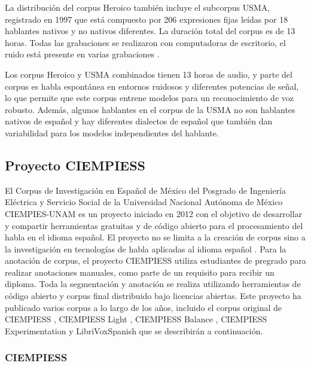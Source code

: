 La distribución del corpus Heroico también incluye el subcorpus USMA, registrado en 1997 que está compuesto por 206 expresiones fijas leídas por 18 hablantes nativos y no nativos diferentes. La duración total del corpus es de 13 horas. Todas las grabaciones se realizaron con computadoras de escritorio, el ruido está presente en varias grabaciones \cite{heroico}.

Los corpus Heroico y USMA combinados tienen 13 horas de audio, y parte del corpus es habla espontánea en entornos ruidosos y diferentes potencias de señal, lo que permite que este corpus entrene modelos para un reconocimiento de voz robusto. Además, algunos hablantes en el corpus de la USMA no son hablantes nativos de español y hay diferentes dialectos de español que también dan variabilidad para los modelos independientes del hablante.

\subsection{Proyecto CIEMPIESS}

El Corpus de Investigación en Español de México del Posgrado de Ingeniería Eléctrica y Servicio Social de la Universidad Nacional Autónoma de México CIEMPIES-UNAM es un proyecto iniciado en 2012 con el objetivo de desarrollar y compartir herramientas gratuitas y de código abierto para el procesamiento del habla en el idioma español. El proyecto no se limita a la creación de corpus sino a la investigación en tecnologías de habla aplicadas al idioma español \cite{CIEMPIESS-Webpage}. Para la anotación de corpus, el proyecto CIEMPIESS utiliza estudiantes de pregrado para realizar anotaciones manuales, como parte de un requisito para recibir un diploma. Toda la segmentación y anotación se realiza utilizando herramientas de código abierto y corpus final distribuido bajo licencias abiertas. Este proyecto ha publicado varios corpus a lo largo de los años, incluido el corpus original de CIEMPIESS \cite {CIEMPIESS}, CIEMPIESS Light \cite {CIEMPIESS-LIGHT}, CIEMPIESS Balance \cite {CIEMPIESS-BALANCE}, CIEMPIESS Experimentation \cite {CIEMPIESS-Experimentation} y LibriVoxSpanish \cite {LibriVox-Spanish} que se describirán a continuación.

\subsubsection{CIEMPIESS}

